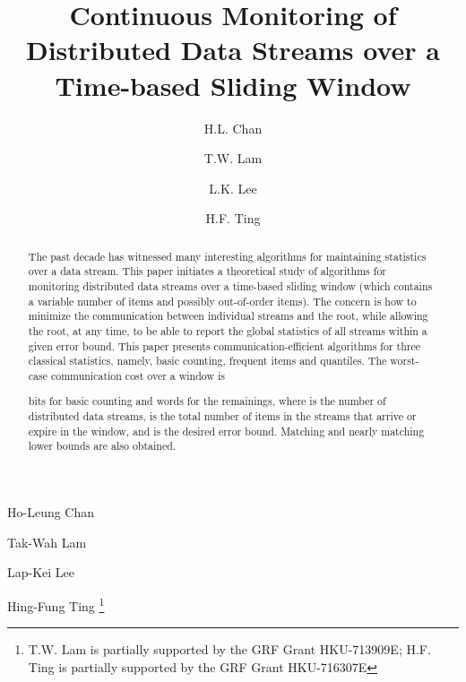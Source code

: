\documentclass[proceedings]{stacs}
\theoremstyle{definition}\newtheorem{fact}{Fact}
\begin{document}
\title[Continuous Monitoring of Distributed Data Streams over Sliding Window]
{Continuous Monitoring of Distributed Data Streams over a Time-based Sliding Window}

\author[lab1]{H.L. Chan}{Ho-Leung Chan}
\address[lab1]{Department of Computer Science, University of Hong Kong, Hong Kong}  
\author[lab1]{T.W. Lam}{Tak-Wah Lam}
\author[lab2]{L.K. Lee}{Lap-Kei Lee}
\address[lab2]{Max-Planck-Institut f\"ur Informatik, 66123 Saarbr\"ucken, Germany}	
\author[lab1]{H.F. Ting}{Hing-Fung Ting}
\thanks{T.W. Lam is partially supported by the GRF Grant HKU-713909E;
H.F. Ting is partially supported by the GRF Grant HKU-716307E}





\begin{abstract}
\noindent
The past decade has witnessed many interesting algorithms for maintaining
statistics over a data stream.
This paper initiates a theoretical study of algorithms for
monitoring distributed data streams over a time-based sliding window
(which contains a variable number of items
and possibly out-of-order items).  The concern is how to
minimize the communication between individual streams and the root,
while allowing the root, at any time, to be able to report the
global statistics of all streams within a given error bound.  This
paper presents communication-efficient algorithms for three
classical statistics, namely, basic counting,
frequent items and quantiles.
The worst-case communication cost over a window is

bits for basic counting and
 words for the remainings, where
 is the number of distributed data streams,  is
the  {total}
 number of items in the streams that arrive or expire in the
window, and
 is the desired error bound. Matching and
nearly matching lower bounds are also obtained.
\end{abstract}

\maketitle
\end{document}
